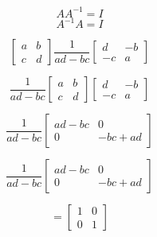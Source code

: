 \[ A A^{-1} = I\] \[A^{-1}A = I\]

\[ \begin{bmatrix} a &b \\ c & d \end{bmatrix} \frac{1}{ad-bc}\begin{bmatrix} d & -b \\ -c & a \end{bmatrix} \]

\[ \frac{1}{ad-bc}\begin{bmatrix} a &b \\ c & d \end{bmatrix} \begin{bmatrix} d & -b \\ -c & a \end{bmatrix} \]

\[ \frac{1}{ad-bc}\begin{bmatrix} ad -bc & 0 \\ 0 & -bc + ad \end{bmatrix} \]

\[ \frac{1}{ad-bc}\begin{bmatrix} ad -bc & 0 \\ 0 & -bc + ad \end{bmatrix} \]

\[= \begin{bmatrix} 1 & 0 \\ 0 & 1 \end{bmatrix} \]

